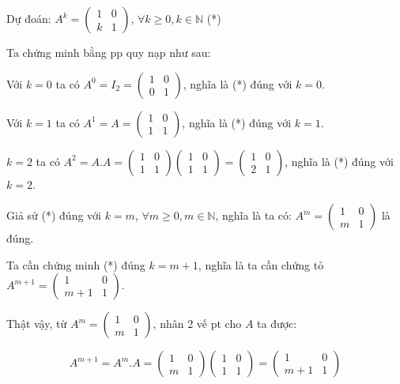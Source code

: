 \documentclass[12pt,a4paper]{article} \usepackage[utf8]{inputenc} \usepackage[T5]{fontenc} \usepackage[vietnamese]{babel} \usepackage{amsmath, amssymb, amsfonts} \usepackage{ulem}
\begin{document}
Dự đoán: $A^k = \begin{pmatrix} 1 & 0 \\ k & 1 \end{pmatrix}$,
$\forall k \ge 0, k \in \mathbb{N}$ (*)

Ta chứng minh bằng pp quy nạp như sau:

Với $k = 0$ ta có
$A^0 = I_2 = \begin{pmatrix} 1 & 0 \\ 0 & 1 \end{pmatrix}$, nghĩa là (*)
đúng với $k = 0$.

Với $k = 1$ ta có
$A^1 = A = \begin{pmatrix} 1 & 0 \\ 1 & 1 \end{pmatrix}$, nghĩa là (*)
đúng với $k = 1$.

$k = 2$ ta có
$A^2 = A.A = \begin{pmatrix} 1 & 0 \\ 1 & 1 \end{pmatrix} \begin{pmatrix} 1 & 0 \\ 1 & 1 \end{pmatrix} = \begin{pmatrix} 1 & 0 \\ 2 & 1 \end{pmatrix}$, nghĩa là (*)
đúng với $k = 2$.

Giả sử (*) đúng với $k = m$, $\forall m \ge 0, m \in \mathbb{N}$, nghĩa là ta
có: $A^m = \begin{pmatrix} 1 & 0 \\ m & 1 \end{pmatrix}$ là đúng.

Ta cần chứng minh (*) đúng $k = m + 1$, nghĩa là ta
cần chứng tỏ $A^{m+1} = \begin{pmatrix} 1 & 0 \\ m+1 & 1 \end{pmatrix}$.

Thật vậy, từ $A^m = \begin{pmatrix} 1 & 0 \\ m & 1 \end{pmatrix}$,
nhân 2 vế pt cho $A$ ta được:

$$
A^{m+1} = A^m.A = \begin{pmatrix} 1 & 0 \\ m & 1 \end{pmatrix} \begin{pmatrix} 1 & 0 \\ 1 & 1 \end{pmatrix} = \begin{pmatrix} 1 & 0 \\ m+1 & 1 \end{pmatrix}
$$
\end{document}
